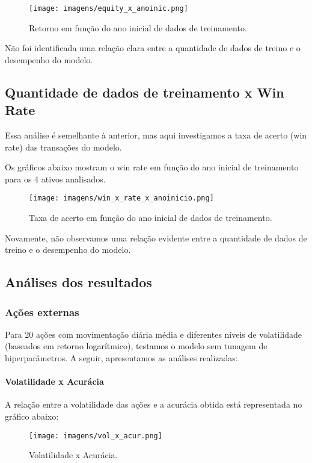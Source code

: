 \documentclass{article}
\begin{document}
\begin{figure}[H]
    \centering
    \texttt{[image: imagens/equity\_x\_anoinic.png]}
    \caption{Retorno em função do ano inicial de dados de treinamento.}
    \label{fig:retorno-anoinicial}
\end{figure}

Não foi identificada uma relação clara entre a quantidade de dados de treino e o desempenho do modelo.

\subsection{Quantidade de dados de treinamento x Win Rate}
Essa análise é semelhante à anterior, mas aqui investigamos a taxa de acerto (win rate) das transações do modelo.

Os gráficos abaixo mostram o win rate em função do ano inicial de treinamento para os 4 ativos analisados.

\begin{figure}[H]
    \centering
    \texttt{[image: imagens/win\_x\_rate\_x\_anoinicio.png]}
    \caption{Taxa de acerto em função do ano inicial de dados de treinamento.}
    \label{fig:winrate-anoinicial}
\end{figure}

Novamente, não observamos uma relação evidente entre a quantidade de dados de treino e o desempenho do modelo.

\subsection{Análises dos resultados}

\subsubsection{Ações externas}
Para 20 ações com movimentação diária média e diferentes níveis de volatilidade (baseados em retorno logarítmico), testamos o modelo sem tunagem de hiperparâmetros. A seguir, apresentamos as análises realizadas:

\paragraph{Volatilidade x Acurácia}
A relação entre a volatilidade das ações e a acurácia obtida está representada no gráfico abaixo:

\begin{figure}[H]
    \centering
    \texttt{[image: imagens/vol\_x\_acur.png]}
    \caption{Volatilidade x Acurácia.}
    \label{fig:volatilidade-acuracia}
\end{figure}
\end{document}
